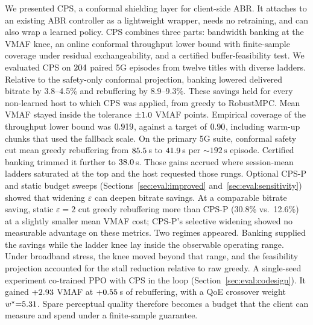 We presented CPS, a conformal shielding layer for client-side ABR. It attaches to an existing ABR controller as a lightweight wrapper, needs no retraining, and can also wrap a learned policy. CPS combines three parts: bandwidth banking at the VMAF knee, an online conformal throughput lower bound with finite-sample coverage under residual exchangeability, and a certified buffer-feasibility test.
We evaluated CPS on \(204\) paired \mbox{5G} episodes from twelve titles with diverse ladders. Relative to the safety-only conformal projection, banking lowered delivered bitrate by 3.8--4.5\% and rebuffering by 8.9--9.3\%. These savings held for every non-learned host to which CPS was applied, from greedy to RobustMPC. Mean VMAF stayed inside the tolerance \(\pm1.0\) VMAF points. Empirical coverage of the throughput lower bound was \(0.919\), against a target of \(0.90\), including warm-up chunks that used the fallback scale.
On the primary \mbox{5G} suite, conformal safety cut mean greedy rebuffering from \(85.5\)\,s to \(41.9\)\,s per \(\sim\!192\,\mathrm{s}\) episode. Certified banking trimmed it further to \(38.0\)\,s. Those gains accrued where session-mean ladders saturated at the top and the host requested those rungs.
Optional CPS-P and static budget sweeps (Sections~\ref{sec:eval:improved} and~\ref{sec:eval:sensitivity}) showed that widening \(\varepsilon\) can deepen bitrate savings.
At a comparable bitrate saving, static \(\varepsilon{=}2\) cut greedy rebuffering more than CPS-P (30.8\% vs.\ 12.6\%) at a slightly smaller mean VMAF cost; CPS-P's selective widening showed no measurable advantage on these metrics.
Two regimes appeared. Banking supplied the savings while the ladder knee lay inside the observable operating range. Under broadband stress, the knee moved beyond that range, and the feasibility projection accounted for the stall reduction relative to raw greedy.
A single-seed experiment co-trained PPO with CPS in the loop (Section~\ref{sec:eval:codesign}). It gained \(+2.93\) VMAF at \(+0.55\)\,s of rebuffering, with a QoE crossover weight \(w^{\star}{=}5.31\).
Spare perceptual quality therefore becomes a budget that the client can measure and spend under a finite-sample guarantee.

